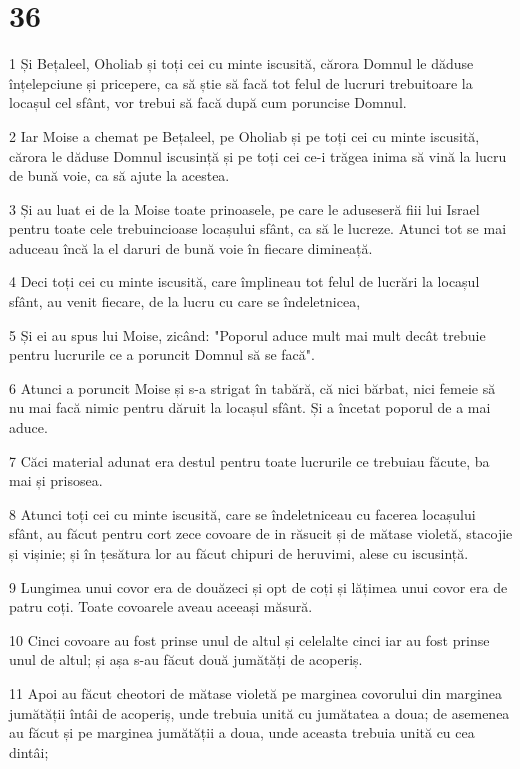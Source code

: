 \chapter{36}

\par 1 Și Bețaleel, Oholiab și toți cei cu minte iscusită, cărora Domnul le dăduse înțelepciune și pricepere, ca să știe să facă tot felul de lucruri trebuitoare la locașul cel sfânt, vor trebui să facă după cum poruncise Domnul.
\par 2 Iar Moise a chemat pe Bețaleel, pe Oholiab și pe toți cei cu minte iscusită, cărora le dăduse Domnul iscusință și pe toți cei ce-i trăgea inima să vină la lucru de bună voie, ca să ajute la acestea.
\par 3 Și au luat ei de la Moise toate prinoasele, pe care le aduseseră fiii lui Israel pentru toate cele trebuincioase locașului sfânt, ca să le lucreze. Atunci tot se mai aduceau încă la el daruri de bună voie în fiecare dimineață.
\par 4 Deci toți cei cu minte iscusită, care împlineau tot felul de lucrări la locașul sfânt, au venit fiecare, de la lucru cu care se îndeletnicea,
\par 5 Și ei au spus lui Moise, zicând: "Poporul aduce mult mai mult decât trebuie pentru lucrurile ce a poruncit Domnul să se facă".
\par 6 Atunci a poruncit Moise și s-a strigat în tabără, că nici bărbat, nici femeie să nu mai facă nimic pentru dăruit la locașul sfânt. Și a încetat poporul de a mai aduce.
\par 7 Căci material adunat era destul pentru toate lucrurile ce trebuiau făcute, ba mai și prisosea.
\par 8 Atunci toți cei cu minte iscusită, care se îndeletniceau cu facerea locașului sfânt, au făcut pentru cort zece covoare de in răsucit și de mătase violetă, stacojie și vișinie; și în țesătura lor au făcut chipuri de heruvimi, alese cu iscusință.
\par 9 Lungimea unui covor era de douăzeci și opt de coți și lățimea unui covor era de patru coți. Toate covoarele aveau aceeași măsură.
\par 10 Cinci covoare au fost prinse unul de altul și celelalte cinci iar au fost prinse unul de altul; și așa s-au făcut două jumătăți de acoperiș.
\par 11 Apoi au făcut cheotori de mătase violetă pe marginea covorului din marginea jumătății întâi de acoperiș, unde trebuia unită cu jumătatea a doua; de asemenea au făcut și pe marginea jumătății a doua, unde aceasta trebuia unită cu cea dintâi;
